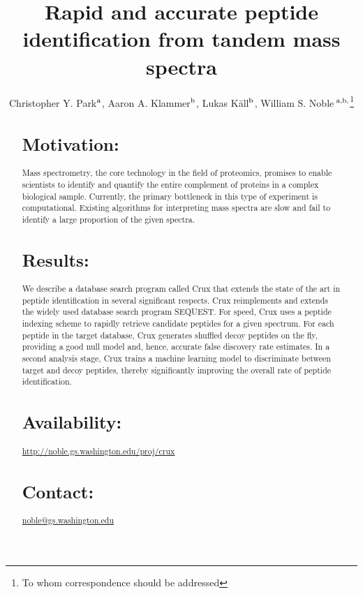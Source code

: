 \documentclass{bioinfo}
\begin{document}

\title[Rapid and accurate peptide identification]{Rapid and accurate
  peptide identification from tandem mass spectra}
\author[Park \textit{et~al}]{Christopher Y. Park$^{\rm a}$,
Aaron A. Klammer$^{\rm b}$,
Lukas K\"{a}ll$^{\rm b}$, 
William S. Noble\,$^{\rm a,b,}$\footnote{To whom correspondence should be addressed}}
\address{
$^{\rm a}$Department of Computer Science and Engineering,
$^{\rm b}$Department of Genome Sciences, University of Washington,
  Seattle, WA, USA
}


\maketitle

\begin{abstract}
\section{Motivation:}  Mass spectrometry, the core technology in the
field of proteomics, promises to enable scientists to identify and
quantify the entire complement of proteins in a complex biological
sample.  Currently, the primary bottleneck in this type of experiment
is computational.  Existing algorithms for interpreting mass spectra
are slow and fail to identify a large proportion of the given spectra.

\section{Results:} We describe a database search program called Crux
that extends the state of the art in peptide identification in several
significant respects.  Crux reimplements and extends the widely used
database search program SEQUEST.  For speed, Crux uses a peptide
indexing scheme to rapidly retrieve candidate peptides for a given
spectrum.  For each peptide in the target database, Crux generates
shuffled decoy peptides on the fly, providing a good null model and,
hence, accurate false discovery rate estimates.  In a second analysis
stage, Crux trains a machine learning model to discriminate between
target and decoy peptides, thereby significantly improving the overall
rate of peptide identification.

\section{Availability:}
\href{http://noble.gs.washington.edu/proj/crux}{http://noble.gs.washington.edu/proj/crux}
\section{Contact:} \href{noble@gs.washington.edu}{noble@gs.washington.edu}
\end{abstract}
\end{document}
